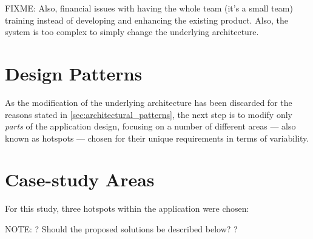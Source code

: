 FIXME: Also, financial issues with having the whole team (it's a small team) training instead of developing and enhancing the existing product. Also, the system is too complex to simply change the underlying architecture. %

\section{Design Patterns}\label{sec:design_patterns}

As the modification of the underlying architecture has been discarded for the reasons stated in \ref{sec:architectural_patterns}, the next step is to modify only \emph{parts} of the application design, focusing on a number of different areas --- also known as hotspots --- chosen for their unique requirements in terms of variability.


\section{Case-study Areas}\label{sec:case-study_areas}

For this study, three hotspots within the application were chosen:

NOTE: ? Should the proposed solutions be described below? ?

